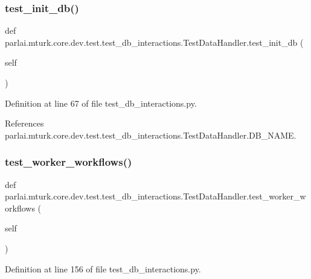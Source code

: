 \subsubsection{\texorpdfstring{test\+\_\+init\+\_\+db()}{test\_init\_db()}}
{\footnotesize\ttfamily def parlai.\+mturk.\+core.\+dev.\+test.\+test\+\_\+db\+\_\+interactions.\+Test\+Data\+Handler.\+test\+\_\+init\+\_\+db (\begin{DoxyParamCaption}\item[{}]{self }\end{DoxyParamCaption})}



Definition at line 67 of file test\+\_\+db\+\_\+interactions.\+py.



References parlai.\+mturk.\+core.\+dev.\+test.\+test\+\_\+db\+\_\+interactions.\+Test\+Data\+Handler.\+D\+B\+\_\+\+N\+A\+ME.

\mbox{\label{classparlai_1_1mturk_1_1core_1_1dev_1_1test_1_1test__db__interactions_1_1TestDataHandler_ae2fb8890a053c2c5bb84f0a27c021140}} 
\subsubsection{\texorpdfstring{test\+\_\+worker\+\_\+workflows()}{test\_worker\_workflows()}}
{\footnotesize\ttfamily def parlai.\+mturk.\+core.\+dev.\+test.\+test\+\_\+db\+\_\+interactions.\+Test\+Data\+Handler.\+test\+\_\+worker\+\_\+workflows (\begin{DoxyParamCaption}\item[{}]{self }\end{DoxyParamCaption})}



Definition at line 156 of file test\+\_\+db\+\_\+interactions.\+py.



